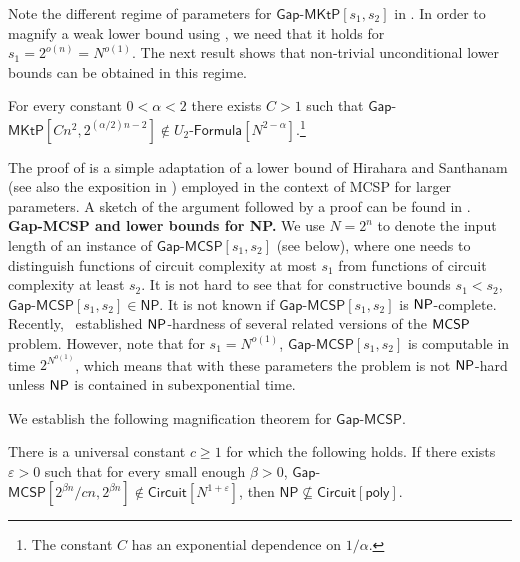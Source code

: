 \documentclass{toc}
\newcommand{\NP}{\ensuremath{{\sf NP}}\xspace}
\newcommand{\MCSP}{\ensuremath{{\sf MCSP}}\xspace}
\newcommand{\gapmktp}{\mathsf{Gap}$-$\mathsf{MKtP}}
\newcommand{\gapmcsp}{\mathsf{Gap}$-$\mathsf{MCSP}}
\begin{document}
Note the different regime of parameters for $\gapmktp[s_1,s_2]$ in  . In order to magnify a weak lower bound using , we need that it holds for $s_1 = 2^{o(n)} = N^{o(1)}$. The next result shows that non-trivial unconditional lower bounds can be obtained in this regime.


\begin{theorem}\label{thm:lower_bound} For every constant $0 < \alpha < 2$ there exists $C > 1$ such that $\gapmktp[Cn^2, 2^{(\alpha/2)n - 2}] \notin U_2$-$\mathsf{Formula}[N^{2 - \alpha}]$.\footnote{The constant $C$ has an exponential dependence on $1/\alpha$.}
\end{theorem}


The proof of  is a simple adaptation of a lower bound of Hirahara and Santhanam \cite[Section 4]{DBLP:conf/coco/HiraharaS17} (see also the exposition in \cite[Appendix C.1]{OS18}) employed in the context of MCSP for larger parameters. A sketch of the argument followed by a proof can be found in .\\

\noindent \textbf{Gap-MCSP and lower bounds for NP.} We use $N = 2^n$ to denote the input length of an instance of $\gapmcsp[s_1,s_2]$ (see  below), where one needs to distinguish functions of circuit complexity at most $s_1$ from functions of circuit complexity at least $s_2$. It is not hard to see that for constructive bounds $s_1 < s_2$, $\gapmcsp[s_1,s_2] \in \mathsf{NP}$. It is not known if $\gapmcsp[s_1,s_2]$ is \NP-complete. Recently,~\cite{DBLP:conf/coco/IlangoLO20} established \NP-hardness of several related versions of the \MCSP problem. However, note that for $s_1=N^{o(1)}$, $\gapmcsp[s_1,s_2]$ is computable in time $2^{N^{o(1)}}$, which means that with these parameters the problem is not \NP-hard unless \NP is contained in subexponential time.

We establish the following magnification theorem for $\gapmcsp$.

\begin{theorem}\label{thm:magnification_mcsp}
There is a universal constant $c \geq 1$ for which the following holds. If there exists $\varepsilon > 0$ such that for every small enough $\beta > 0$, $\gapmcsp[2^{\beta n}/cn, 2^{\beta n}] \notin \mathsf{Circuit}[N^{1 + \varepsilon}]$, then $\mathsf{NP} \nsubseteq \mathsf{Circuit}[\mathsf{poly}]$.
\end{theorem}
\end{document}
